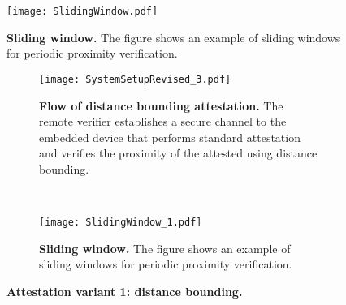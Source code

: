 \begin{figure}[t]
  \centering
    \texttt{[image: SlidingWindow.pdf]}
    \caption{\textbf{Sliding window.} The figure shows an example of sliding windows for periodic proximity verification.}
    \vspace{-10px}
    \label{fig:slidingWindow}
\end{figure}

\else

\begin{figure*}[t!]
    \centering
    \begin{subfigure}[t]{0.6\textwidth}
        \centering
        \texttt{[image: SystemSetupRevised\_3.pdf]}
        \caption{\textbf{Flow of distance bounding attestation.} The remote verifier establishes a secure channel to the \device embedded device that performs standard attestation and verifies the proximity of the attested using distance bounding.}
        \label{fig:systemSetUp}
    \end{subfigure}%
    ~ ~~
    \begin{subfigure}[t]{0.4\textwidth}
        \centering
        \texttt{[image: SlidingWindow\_1.pdf]}
        \caption{\textbf{Sliding window.} The figure shows an example of sliding windows for periodic proximity verification.}
        \label{fig:slidingWindow}
    \end{subfigure}
    \caption{\textbf{Attestation variant 1: distance bounding.}}
\end{figure*}



\fi

